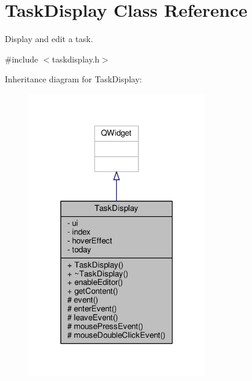 \hypertarget{classTaskDisplay}{}\section{Task\+Display Class Reference}
\label{classTaskDisplay}


Display and edit a task.  




{\ttfamily \#include $<$taskdisplay.\+h$>$}



Inheritance diagram for Task\+Display\+:
\nopagebreak
\begin{figure}[H]
\begin{center}
\leavevmode
\includegraphics[width=219pt]{classTaskDisplay__inherit__graph}
\end{center}
\end{figure}


